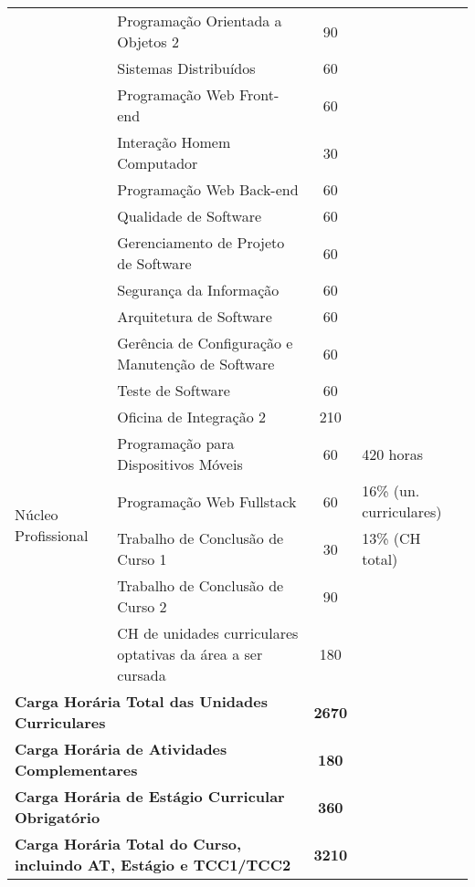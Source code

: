 \begin{quadro}[ht!]
\begin{tabular}{|l|l|c|p{3.2cm}|}
\cline{2-3} & Programação Orientada a Objetos 2 & 90 & \\
\cline{2-3} & Sistemas Distribuídos & 60 & \\
\cline{2-3} & Programação Web Front-end & 60 & \\
\cline{2-3} & Interação Homem Computador & 30 & \\
\cline{2-3} & Programação Web Back-end & 60 & \\
\cline{2-3} & Qualidade de Software & 60 & \\
\cline{2-3} & Gerenciamento de Projeto de Software & 60 & \\
\cline{2-3} & Segurança da Informação & 60 & \\
\cline{2-3} & Arquitetura de Software & 60 & \\
\cline{2-3} & Gerência de Configuração e Manutenção de Software & 60 & \\
\cline{2-3} & Teste de Software  & 60 & \\
\cline{2-3} & Oficina de Integração 2 & 210 & \\
\hline
\multirow{4}{*}{Núcleo Profissional} & Programação para Dispositivos Móveis & 60 & 420 horas  \\
\cline{2-3} & Programação Web Fullstack & 60 & 16\% (un. curriculares)\\
\cline{2-3} & Trabalho de Conclusão de Curso 1 & 30 & 13\% (CH total)\\
\cline{2-3} & Trabalho de Conclusão de Curso 2 & 90 & \\
\cline{2-3} & CH de unidades curriculares optativas da área a ser cursada & 180 & \\
\hline
\multicolumn{2}{|l|}{\textbf{Carga Horária Total das Unidades Curriculares}} & \textbf{2670} &  \\\hline
\multicolumn{2}{|l|}{\textbf{Carga Horária de Atividades Complementares}} & \textbf{180} &  \\\hline
\multicolumn{2}{|l|}{\textbf{Carga Horária de Estágio Curricular Obrigatório}} & \textbf{360} &  \\\hline
\multicolumn{2}{|l|}{\textbf{Carga Horária Total do Curso, incluindo AT, Estágio e TCC1/TCC2}} & \textbf{3210} & \\\hline
\end{tabular}
\end{quadro}
